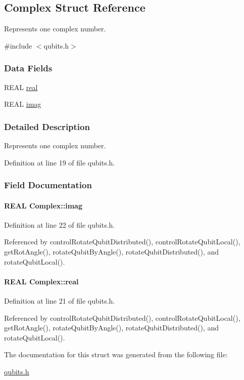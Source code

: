 \hypertarget{structComplex}{
\subsection{Complex Struct Reference}
\label{structComplex}
}


Represents one complex number.  


{\ttfamily \#include $<$qubits.h$>$}\subsubsection*{Data Fields}
\begin{DoxyCompactItemize}
\item 
REAL \hyperlink{structComplex_a479ad939835457595fcca3ca55c06283}{real}
\item 
REAL \hyperlink{structComplex_a1151948284b21c0052f203f23ab931d9}{imag}
\end{DoxyCompactItemize}


\subsubsection{Detailed Description}
Represents one complex number. 

Definition at line 19 of file qubits.h.

\subsubsection{Field Documentation}
\hypertarget{structComplex_a1151948284b21c0052f203f23ab931d9}{
\paragraph[{imag}]{\setlength{\rightskip}{0pt plus 5cm}REAL {\bf Complex::imag}}\hfill}
\label{structComplex_a1151948284b21c0052f203f23ab931d9}


Definition at line 22 of file qubits.h.

Referenced by controlRotateQubitDistributed(), controlRotateQubitLocal(), getRotAngle(), rotateQubitByAngle(), rotateQubitDistributed(), and rotateQubitLocal().\hypertarget{structComplex_a479ad939835457595fcca3ca55c06283}{
\paragraph[{real}]{\setlength{\rightskip}{0pt plus 5cm}REAL {\bf Complex::real}}\hfill}
\label{structComplex_a479ad939835457595fcca3ca55c06283}


Definition at line 21 of file qubits.h.

Referenced by controlRotateQubitDistributed(), controlRotateQubitLocal(), getRotAngle(), rotateQubitByAngle(), rotateQubitDistributed(), and rotateQubitLocal().

The documentation for this struct was generated from the following file:\begin{DoxyCompactItemize}
\item 
\hyperlink{qubits_8h}{qubits.h}\end{DoxyCompactItemize}
